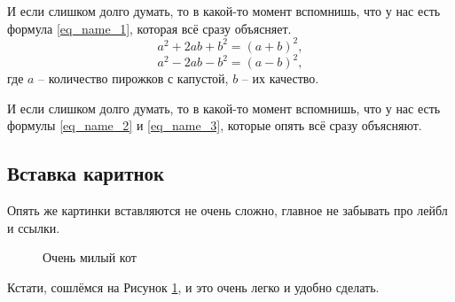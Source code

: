 \documentclass[a4paper, 12pt]{article}
\begin{document}
И если слишком долго думать, то в какой-то момент вспомнишь, что у нас есть формула \ref{eq_name_1}, которая всё сразу объясняет.
\begin{equation}
    a^2 + 2ab + b ^2 = (a + b)^2,
    \label{eq_name_2}
\end{equation}
\begin{equation}
    a^2 - 2ab - b^2 = (a - b)^2,
    \label{eq_name_3}
\end{equation}
где $a$ -- количество пирожков с капустой, $b$ -- их качество.

И если слишком долго думать, то в какой-то момент вспомнишь, что у нас есть формулы \ref{eq_name_2} и \ref{eq_name_3}, которые опять всё сразу объясняют.

\subsection{Вставка каритнок}
Опять же картинки вставляются не очень сложно, главное не забывать про лейбл и ссылки.
\begin{figure}[h]
    \caption{\label{img_cat}Очень милый кот}
\end{figure}

Кстати, сошлёмся на Рисунок \ref{img_cat}, и это очень легко и удобно сделать.
\end{document}
